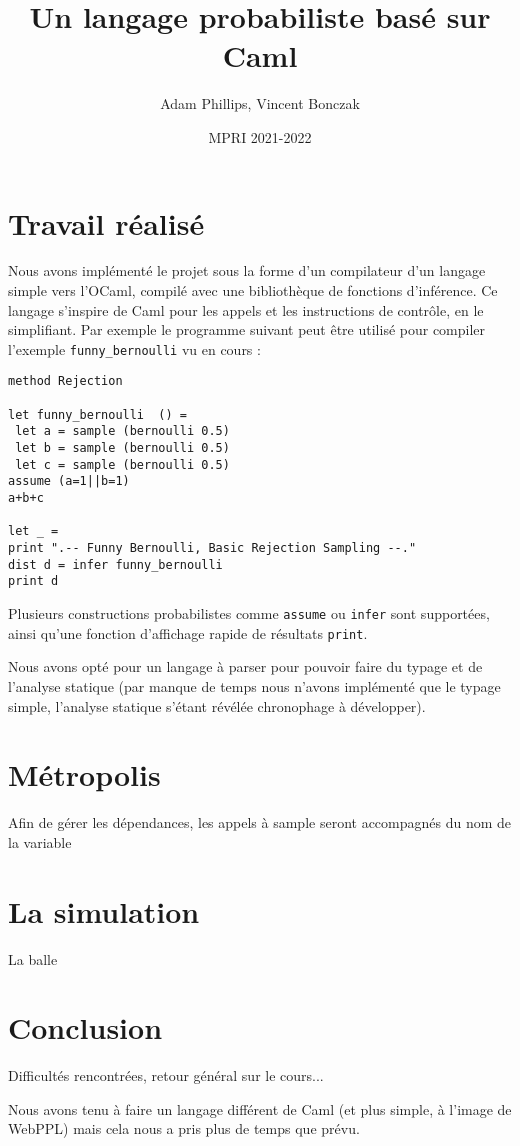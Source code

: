 \documentclass[svgnames]{article}
\begin{document}
\title{Un langage probabiliste basé sur Caml}

\author{Adam Phillips, Vincent Bonczak}

\date{MPRI 2021-2022}

\maketitle

\section{Travail réalisé}

Nous avons implémenté le projet sous la forme d'un compilateur d'un langage simple vers l'OCaml, compilé avec une bibliothèque de fonctions d'inférence.
Ce langage s'inspire de Caml pour les appels et les instructions de contrôle, en le simplifiant. Par exemple le programme suivant peut être utilisé pour compiler l'exemple \verb|funny_bernoulli| vu en cours :
\begin{lstlisting}
method Rejection

let funny_bernoulli  () =  
 let a = sample (bernoulli 0.5)  
 let b = sample (bernoulli 0.5)  
 let c = sample (bernoulli 0.5) 
assume (a=1||b=1)
a+b+c

let _ = 
print ".-- Funny Bernoulli, Basic Rejection Sampling --."
dist d = infer funny_bernoulli  
print d
\end{lstlisting}

\bigskip

Plusieurs constructions probabilistes comme \verb|assume| ou \verb|infer| sont supportées, ainsi qu'une fonction d'affichage rapide de résultats \verb|print|.

Nous avons opté pour un langage à parser pour pouvoir faire du typage et de l'analyse statique (par manque de temps nous n'avons implémenté que le typage simple,
l'analyse statique s'étant révélée chronophage à développer).

\section{Métropolis}

Afin de gérer les dépendances, les appels à sample seront accompagnés du nom de la variable 

\section{La simulation}

La balle

\section{Conclusion}

Difficultés rencontrées, retour général sur le cours...

Nous avons tenu à faire un langage différent de Caml (et plus simple, à l'image de WebPPL) mais cela nous a pris plus de temps que prévu.
\end{document}
